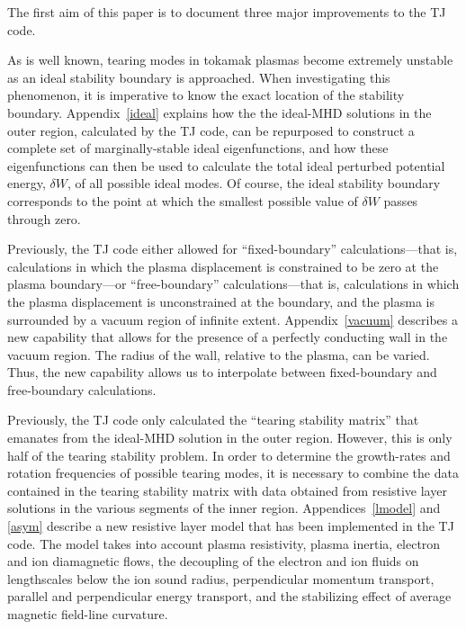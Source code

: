 \documentclass[12pt,prb,aps]{revtex4-1}
\begin{document}
The first aim of this paper is to document three major improvements to the TJ code. 

As is well known, tearing modes in tokamak plasmas become extremely
unstable as an ideal stability boundary is approached.\cite{brennan,bren1,bren2} When investigating this phenomenon, it is imperative to know the exact location
of the  stability boundary. Appendix~\ref{ideal} explains how the the ideal-MHD solutions in the outer region, calculated by the TJ code, can be repurposed to
construct a complete set of marginally-stable ideal eigenfunctions, and how these eigenfunctions can then be used to calculate the total ideal perturbed potential
energy, $\delta W$, of all possible ideal modes.  Of course, the ideal stability boundary corresponds to the point at which the smallest possible value of $\delta W$ passes through
zero.\cite{freidberg,ideal}

Previously, the TJ code either allowed for  ``fixed-boundary''  calculations---that is, calculations in which the plasma displacement is constrained to be zero at the plasma boundary---or ``free-boundary'' calculations---that is, calculations in which the plasma displacement is unconstrained at the boundary,  and the plasma is surrounded by a vacuum region of infinite extent. Appendix~\ref{vacuum} describes a
new capability that allows for the presence of a perfectly conducting wall in the vacuum region. The radius of the wall, relative to the plasma, can be varied. Thus, the new
capability allows us to interpolate between fixed-boundary and free-boundary calculations. 

Previously, the TJ code only calculated the ``tearing stability matrix'' that emanates from the ideal-MHD solution in the outer region. However, this is only half of the tearing stability problem. 
In order to determine the growth-rates and rotation frequencies of possible tearing modes, it is necessary to combine the data contained in the tearing stability matrix with data obtained from resistive layer solutions
in the various segments of the inner region. Appendices~\ref{lmodel} and \ref{asym}   describe a new resistive layer model that has been implemented in the TJ code. The model takes into account 
plasma resistivity, plasma inertia, electron and ion diamagnetic flows, the decoupling of the electron and ion fluids on lengthscales below the ion sound radius, perpendicular
momentum transport, parallel and perpendicular energy transport, and the stabilizing effect of average magnetic field-line curvature.
\end{document}

